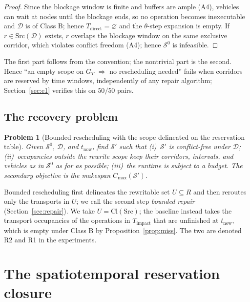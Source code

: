 \documentclass[manuscript,screen,review]{acmart}
\newcommand{\NPairs}{50}
\newcommand{\PassMiss}{\NPairs/\NPairs}      %
\newtheorem{problem}{Problem}
\begin{document}
\begin{proof}
Since the blockage window is finite and buffers are ample (A4), vehicles can wait at nodes until the blockage ends, so no operation becomes inexecutable and \(\mathcal{D}\) is of Class B;
hence \(T_{\mathrm{direct}}=\varnothing\) and the \(\theta\)-step expansion is empty. If \(r\in\mathrm{Src}(\mathcal{D})\) exists, \(r\) overlaps the blockage window on the same exclusive corridor,
which violates conflict freedom (A4); hence \(\mathcal{S}^0\) is infeasible.
\end{proof}

The first part follows from the convention; the nontrivial part is the second. Hence ``an empty scope on \(G_T\) \(\Rightarrow\) no rescheduling needed'' fails when corridors are reserved by time windows,
independently of any repair algorithm; Section~\ref{sec:e1} verifies this on \(\PassMiss\) pairs.

\subsection{The recovery problem}
\label{sec:recovery_problem}

\begin{problem}[Bounded rescheduling with the scope delineated on the reservation table]
\label{prob:recovery}
Given \(\mathcal{S}^0\), \(\mathcal{D}\), and \(t_{\mathrm{now}}\), find \(\mathcal{S}'\) such that
(i)~\(\mathcal{S}'\) is conflict-free under \(\mathcal{D}\); (ii)~occupancies outside the rewrite scope keep their corridors, intervals, and vehicles as in \(\mathcal{S}^0\) as far as possible;
(iii)~the runtime is subject to a budget. The secondary objective is the makespan \(C_{\max}(\mathcal{S}')\).
\end{problem}

Bounded rescheduling first delineates the rewritable set \(U\subseteq R\) and then reroutes only the transports in \(U\); we call the second step \emph{bounded repair} (Section~\ref{sec:repair}). We take \(U=\mathrm{Cl}(\mathrm{Src})\);
the baseline instead takes the transport occupancies of the operations in \(T_{\mathrm{impact}}\) that are unfinished at \(t_{\mathrm{now}}\), which is empty under Class B by Proposition~\ref{prop:miss}.
The two are denoted R2 and R1 in the experiments.

\section{The spatiotemporal reservation closure}
\label{sec:strc}
\end{document}
